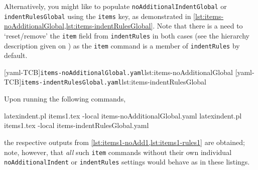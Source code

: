  \begin{example}
 Alternatively, you might like to populate \texttt{noAdditionalIndentGlobal} or
 \texttt{indentRulesGlobal} using the \texttt{items} key, as demonstrated in
 \cref{lst:items-noAdditionalGlobal,lst:items-indentRulesGlobal}. Note that there is a
 need to `reset/remove' the \texttt{item} field from \texttt{indentRules} in both cases
 (see the hierarchy description given on ) as the
 \texttt{item} command is a member of \texttt{indentRules} by default.

 \begin{cmhtcbraster}
  [yaml-TCB]{\texttt{items-noAdditionalGlobal.yaml}}{lst:items-noAdditionalGlobal}
  [yaml-TCB]{\texttt{items-indentRulesGlobal.yaml}}{lst:items-indentRulesGlobal}
 \end{cmhtcbraster}

 Upon running the following commands, 
 \begin{commandshell}
latexindent.pl items1.tex -local items-noAdditionalGlobal.yaml
latexindent.pl items1.tex -local items-indentRulesGlobal.yaml
\end{commandshell}
 the respective outputs from \cref{lst:items1-noAdd1,lst:items1-rules1} are obtained;
 note, however, that \emph{all} such \texttt{item} commands without their own individual
 \texttt{noAdditionalIndent} or \texttt{indentRules} settings would behave as in these
 listings.
 \end{example}
